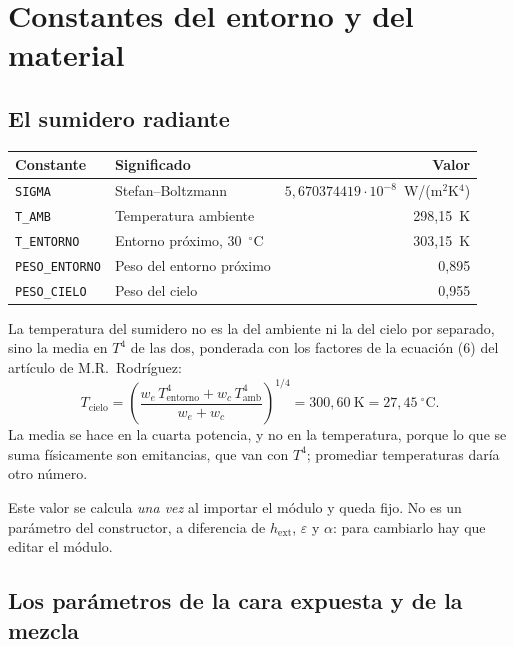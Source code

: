 \documentclass[11pt,a4paper]{article}
\begin{document}
\section{Constantes del entorno y del material}

\subsection{El sumidero radiante}

\begin{center}
\begin{tabular}{llr}
  \toprule
  Constante & Significado & Valor \\
  \midrule
  \texttt{SIGMA}        & Stefan--Boltzmann          & $5{,}670374419\cdot10^{-8}$~W/(m$^2$K$^4$) \\
  \texttt{T\_AMB}       & Temperatura ambiente       & 298,15~K \\
  \texttt{T\_ENTORNO}   & Entorno próximo, 30~$^\circ$C & 303,15~K \\
  \texttt{PESO\_ENTORNO}& Peso del entorno próximo   & 0,895 \\
  \texttt{PESO\_CIELO}  & Peso del cielo             & 0,955 \\
  \bottomrule
\end{tabular}
\end{center}

La temperatura del sumidero no es la del ambiente ni la del cielo por separado,
sino la media en $T^4$ de las dos, ponderada con los factores de la ecuación (6)
del artículo de M.R.\ Rodríguez:
\[
  T_{\mathrm{cielo}} = \left(
    \frac{w_e\,T_{\mathrm{entorno}}^4 + w_c\,T_{\mathrm{amb}}^4}{w_e + w_c}
  \right)^{1/4} = 300{,}60~\mathrm{K} = 27{,}45~^\circ\mathrm{C}.
\]
La media se hace en la cuarta potencia, y no en la temperatura, porque lo que se
suma físicamente son emitancias, que van con $T^4$; promediar temperaturas daría
otro número.

Este valor se calcula \emph{una vez} al importar el módulo y queda fijo. No es un
parámetro del constructor, a diferencia de $h_{\mathrm{ext}}$, $\varepsilon$ y
$\alpha$: para cambiarlo hay que editar el módulo.

\subsection{Los parámetros de la cara expuesta y de la mezcla}
\end{document}
